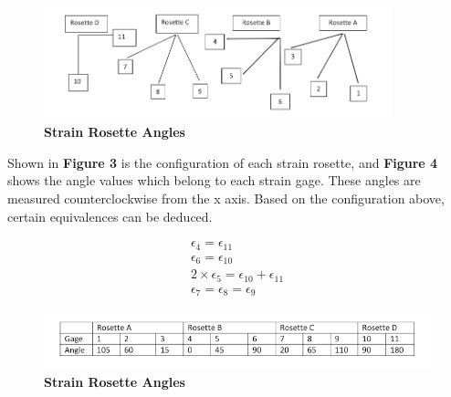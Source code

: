\documentclass{article}
\begin{document}
\begin{figure} [H]
	\centering
	\includegraphics [width=0.9\textwidth]{rosettes}
	\caption{ \textbf{Strain Rosette Angles}}
\end{figure} 
Shown in \textbf{Figure 3} is the configuration of each strain rosette, and \textbf{Figure 4} shows
the angle values which belong to each strain gage. These angles are measured counterclockwise from the 
x axis. Based on the configuration above, certain equivalences can be deduced.

\begin{align}
\epsilon_{4} = \epsilon_{11} \\
\epsilon_{6} = \epsilon_{10} \\ 
2\times\epsilon_{5} = \epsilon_{10} + \epsilon_{11} \\
\epsilon_{7} = \epsilon{_8} = \epsilon_{9} 
\end{align}

\begin{figure} [H]
	\centering
	\includegraphics [width=1.0\textwidth]{gage_angles}
	\caption{ \textbf{Strain Rosette Angles}}
\end{figure} 

\end{document}
